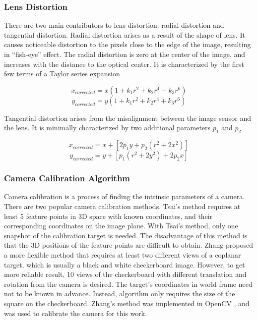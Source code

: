 \subsubsection{Lens Distortion}
There are two main contributors to lens distortion: radial distortion
and tangential distortion. Radial distortion arises as a result of the
shape of lens. It causes noticeable distortion to the pixels close to
the edge of the image, resulting in ``fish-eye'' effect. The radial
distortion is zero at the center of the image, and increases with the
distance to the optical center. It is characterized by the first few
terms of a Taylor series expansion \cite{bradski_learning_2008}

$$ x_{corrected} = x(1+k_1r^2+k_2r^4+k_3r^6)$$
$$ y_{corrected} = y(1+k_1r^2+k_2r^4+k_3r^6)$$

\noindent Tangential distortion arises from the misalignment between
the image sensor and the lens. It is minimally characterized by two
additional parameters $p_1$ and $p_2$ \cite{bradski_learning_2008}

$$x_{corrected} = x+[2p_1y+p_2(r^2+2x^2)]$$
$$y_{corrected} = y+[p_1(r^2+2y^2)+2p_2x]$$

\subsubsection{Camera Calibration Algorithm}
Camera calibration is a process of finding the intrinsic parameters of
a camera. There are two popular camera calibration methods. Tsai's method
\cite{tsai_efficient_1986} requires at least 5 feature points in 3D
space with known coordinates, and their corresponding coordinates on
the image plane. With Tsai's method, only one snapshot of the
calibration target is needed. The disadvantage of this method is that
the 3D positions of the feature points are difficult to obtain. Zhang
\cite{zhang_flexible_2000} proposed a more flexible method that
requires at least two different views of a coplanar target, which is
usually a black and white checkerboard image. However, to get more
reliable result, 10 views of the checkerboard with different
translation and rotation from the camera is desired. The target's
coordinates in world frame need not to be known in advance. Instead,
algorithm only requires the size of the square on the checkerboard.
Zhang's method was implemented in OpenCV \cite{bradski_learning_2008},
and was used to calibrate the camera for this work.


